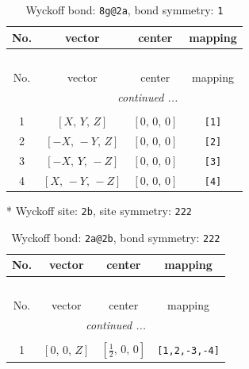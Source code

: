 \documentclass[fleqn,8pt]{jsarticle}
\begin{document}
\begin{longtable}{cccc}
\caption{Wyckoff bond: {\tt 8g@2a}, bond symmetry: {\tt 1}}
 \\
 \hline \hline
No. & vector & center & mapping \\ \hline \endfirsthead

\multicolumn{3}{l}{\tablename\ \thetable{}} \\
 \hline \hline
No. & vector & center & mapping \\ \hline \endhead

 \hline \hline
\multicolumn{3}{r}{\footnotesize\it continued ...} \\ \endfoot

 \hline \hline
\multicolumn{3}{r}{} \\ \endlastfoot

1 & $\left[ X,\, Y,\, Z \right]$ & $\left[ 0,\, 0,\, 0 \right]$ & {\tt [1]} \\ \hline
2 & $\left[ - X,\, - Y,\, Z \right]$ & $\left[ 0,\, 0,\, 0 \right]$ & {\tt [2]} \\ \hline
3 & $\left[ - X,\, Y,\, - Z \right]$ & $\left[ 0,\, 0,\, 0 \right]$ & {\tt [3]} \\ \hline
4 & $\left[ X,\, - Y,\, - Z \right]$ & $\left[ 0,\, 0,\, 0 \right]$ & {\tt [4]} \\
\end{longtable}
* Wyckoff site: {\tt 2b}, site symmetry: {\tt 222}
\renewcommand{\arraystretch}{1.2}
\begin{longtable}{cccc}
\caption{Wyckoff bond: {\tt 2a@2b}, bond symmetry: {\tt 222}}
 \\
 \hline \hline
No. & vector & center & mapping \\ \hline \endfirsthead

\multicolumn{3}{l}{\tablename\ \thetable{}} \\
 \hline \hline
No. & vector & center & mapping \\ \hline \endhead

 \hline \hline
\multicolumn{3}{r}{\footnotesize\it continued ...} \\ \endfoot

 \hline \hline
\multicolumn{3}{r}{} \\ \endlastfoot

1 & $\left[ 0,\, 0,\, Z \right]$ & $\left[ \frac{1}{2},\, 0,\, 0 \right]$ & {\tt [1,2,-3,-4]} \\
\end{longtable}
\renewcommand{\arraystretch}{1.2}
\end{document}
